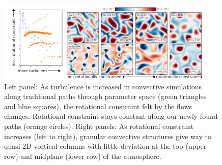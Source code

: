 \documentclass[preprint, hmargin=1in, vmargin=1in]{aastex62}
\begin{document}
\begin{figure}[b]
	\begin{center}
    \includegraphics[width=\textwidth]{./figs/rossby_plot.pdf}
	\end{center}
	\vspace{-11pt}
    \caption{ 
	\citep[From Figs.~1 \& 2 of][]{anders&all2019} Left panel: As turbulence is increased in convective simulations along traditional paths through parameter space (green triangles and blue squares), the rotational constraint felt by the flows changes.
	Rotational constraint stays constant along our newly-found paths (orange circles).
	Right panels: As rotational constraint increases (left to right), granular convective structures give way to quasi-2D vortical columns with little deviation at the top (upper row) and midplane (lower row) of the atmosphere.
	\label{fig:rossby_plot} }
\end{figure}


\newpage
\end{document}
